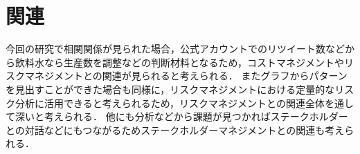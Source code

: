 \documentclass[uplatex,twocolumn,dvipdfmx]{jsarticle}
\begin{document}
\section{関連}
今回の研究で相関関係が見られた場合，公式アカウントでのリツイート数などから飲料水なら生産数を調整などの判断材料となるため，コストマネジメントやリスクマネジメントとの関連が見られると考えられる．
またグラフからパターンを見出すことができた場合も同様に，リスクマネジメントにおける定量的なリスク分析に活用できると考えられるため，リスクマネジメントとの関連全体を通して深いと考えられる．
他にも分析などから課題が見つかればステークホルダーとの対話などにもつながるためステークホルダーマネジメントとの関連も考えられる．\nocite{bib001}\nocite{bib002}\nocite{bib003}

\nocite{bib001}
\nocite{bib003}


\end{document}
